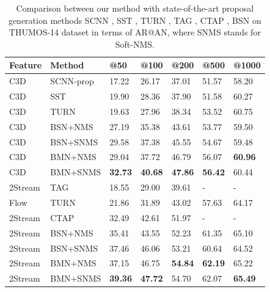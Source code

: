 \documentclass[10pt,twocolumn,letterpaper]{article}
\begin{document}
\begin{table}[tbp]
\centering
\caption{ Comparison between our method with state-of-the-art proposal generation methods SCNN  \cite{shou2016action}, SST \cite{sst_buch_cvpr17}, TURN \cite{gao2017turn}, TAG \cite{zhao2017temporal}, CTAP \cite{gao2018ctap}, BSN \cite{lin2018bsn} on  THUMOS-14 dataset in terms of AR@AN, where SNMS stands for Soft-NMS.} %
\small
\begin{tabular}{m{1.0cm}<{\centering}m{1.6cm}m{0.55cm}<{\centering}m{0.55cm}<{\centering}m{0.55cm}<{\centering}m{0.55cm}<{\centering}m{0.6cm}<{\centering}}
\toprule
Feature & Method  		& @50 & @100  & @200 & @500 & @1000    \\
\hline 
C3D & SCNN-prop & 17.22 & 26.17 &  37.01 & 51.57 & 58.20   \\
C3D & SST		& 19.90 & 28.36 &  37.90 & 51.58 & 60.27   \\
C3D & TURN 		& 19.63 & 27.96 &  38.34 & 53.52 & 60.75 \\
C3D & BSN+NMS 	& 27.19 & 35.38 &  43.61 &  53.77  & 59.50   \\
C3D & BSN+SNMS 	& 29.58 & 37.38 &  45.55 &  54.67  & 59.48   \\
\hline
C3D & BMN+NMS	&  29.04 &  37.72 & 46.79 & 56.07 & {\bf 60.96}  \\
C3D & BMN+SNMS 	& {\bf 32.73} & {\bf 40.68} &  {\bf 47.86} &  {\bf 56.42}  & 60.44   \\
\hline 
\hline
2Stream & TAG 	& 18.55 & 29.00  &  39.61 & - & -  \\
Flow & TURN		& 21.86 & 31.89 & 43.02 & 57.63  & 64.17  \\
2Stream & CTAP  & 32.49 & 42.61 & 51.97 & -  & -  \\
2Stream & BSN+NMS & 	 35.41 & 43.55 &  52.23 &  61.35 & 65.10  \\
2Stream & BSN+SNMS & 	 37.46 & 46.06 &  53.21 & 60.64 & 64.52 \\
\hline
2Stream & BMN+NMS & 	37.15 & 46.75 &  {\bf 54.84} & {\bf 62.19} & 65.22 \\
2Stream & BMN+SNMS & {\bf 39.36} & {\bf 47.72} &  54.70 &  62.07 & {\bf 65.49}  \\
\bottomrule
\end{tabular}
\label{table:proposal_thumos}
\vspace{-0.1cm}
\end{table}
\end{document}
